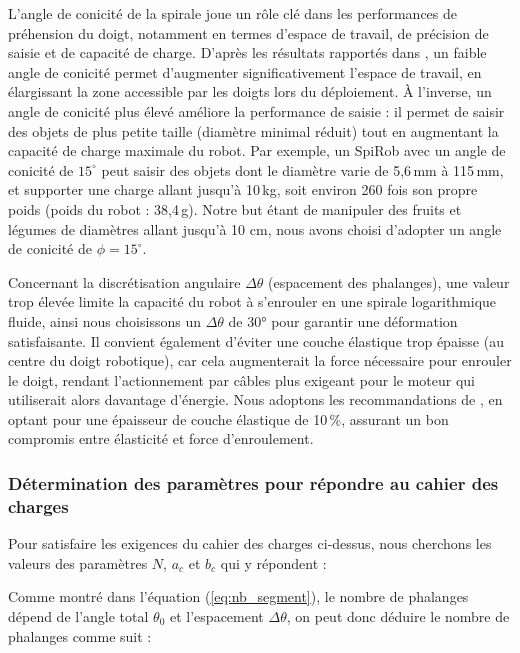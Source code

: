 \documentclass[a4paper, 11pt]{report}
\begin{document}
            L'angle de conicité de la spirale joue un rôle clé dans les performances de préhension du doigt, notamment en termes d’espace de travail, de précision de saisie et de capacité de charge. 
            D’après les résultats rapportés dans \cite{wang_spirobs_2025}, un faible angle de conicité permet d’augmenter significativement l’espace de travail, en élargissant la zone accessible par les doigts lors du déploiement. À l’inverse, un angle de conicité plus élevé améliore la performance de saisie : il permet de saisir des objets de plus petite taille (diamètre minimal réduit) tout en augmentant la capacité de charge maximale du robot.
            Par exemple, un SpiRob avec un angle de conicité de $15^\circ$ peut saisir des objets dont le diamètre varie de 5{,}6\,mm à 115\,mm, et supporter une charge allant jusqu’à 10\,kg, soit environ 260 fois son propre poids (poids du robot : 38{,}4\,g). \cite{wang_spirobs_2025} Notre but étant de manipuler des fruits et légumes de diamètres allant jusqu'à 10 cm, nous avons choisi d’adopter un angle de conicité de $\phi = 15^\circ$.

            Concernant la discrétisation angulaire $\Delta \theta$ (espacement des phalanges), une valeur trop élevée limite la capacité du robot à s’enrouler en une spirale logarithmique fluide, ainsi nous choisissons un $\Delta \theta$ de 30° pour garantir une déformation satisfaisante. Il convient également d’éviter une couche élastique trop épaisse (au centre du doigt robotique), car cela augmenterait la force nécessaire pour enrouler le doigt, rendant l'actionnement par câbles plus exigeant pour le moteur qui utiliserait alors davantage d'énergie. Nous adoptons les recommandations de \cite{wang_spirobs_2025}, en optant pour une épaisseur de couche élastique de 10\,\%, assurant un bon compromis entre élasticité et force d’enroulement.

        \subsubsection{Détermination des paramètres pour répondre au cahier des charges}

            Pour satisfaire les exigences du cahier des charges ci-dessus, nous cherchons les valeurs des paramètres $N$, $a_c$ et $b_c$ qui y répondent : 

            Comme montré dans l’équation (\ref{eq:nb_segment}), le nombre de phalanges dépend de l’angle total $\theta_0$ et l'espacement $\Delta \theta$, on peut donc déduire le nombre de phalanges comme suit :
\end{document}
